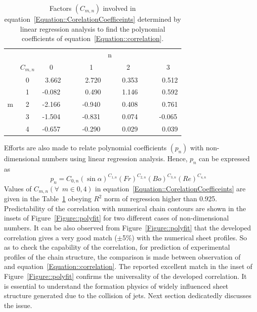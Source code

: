 \begin{table}
	\centering
	\caption{Factors $\left(C_{m,n}\right)$ involved in equation~\ref{Equation::CorelationCoefficeints} determined by linear regression analysis to find the polynomial coefficients of equation~\ref{Equation::correlation}.}
	\label{Table::polyfit}
	\begin{tabular}{@{}cc|ccccccccc@{}}
		&   &     &   & & &n &      &    &   &        \\
		& $C_{m,n}$  & 0 &   &  & 1 &      & 2 & &   & 3      \\\hline
		& 0 & ~3.662&  & & ~2.720&  & ~0.353& & & ~0.512  \\
		& 1  & -0.082 &&  & ~0.490  & & ~1.146& & & ~0.592  \\
		m& 2 & -2.166 & & & -0.940& & ~0.408& & & ~0.761  \\
		& 3 & -1.504& & & -0.831& & ~0.074& & & -0.065 \\
		& 4 & -0.657& & & -0.290& & ~0.029&& & ~0.039  \\ 
	\end{tabular}
\end{table}
Efforts are also made to relate polynomial coefficients $\left(p_n\right)$ with non-dimensional numbers using linear regression analysis. Hence, $p_n$ can be expressed as
\begin{equation}\label{Equation::CorelationCoefficeints}
p_n = C_{0,n}\left(\sin\alpha\right)^{C_{1,n}}\left(Fr\right)^{C_{2,n}}\left(Bo\right)^{C_{3,n}}\left(Re\right)^{C_{4,n}}
\end{equation}
Values of $C_{m,n} \left(\forall\:\: m \in {0,4}\right)$ in equation~\ref{Equation::CorelationCoefficeints} are given in the Table~\ref{Table::polyfit} obeying $R^2$ norm of regression higher than 0.925. Predictability of the correlation with numerical chain contours are shown in the insets of Figure~\ref{Figure::polyfit} for two different cases of non-dimensional numbers. It can be also observed from Figure~\ref{Figure::polyfit} that the developed correlation gives a very good match ($\pm$5\%) with the numerical sheet profiles. So as to check the capability of the correlation, for prediction of experimental profiles of the chain structure, the comparison is made between observation of \citet{bush2004collision} and equation~\ref{Equation::correlation}. The reported excellent match in the inset of Figure~\ref{Figure::polyfit} confirms the universality of the developed correlation. It is essential to understand the formation physics of widely influenced sheet structure generated due to the collision of jets. Next section dedicatedly discusses the issue.

